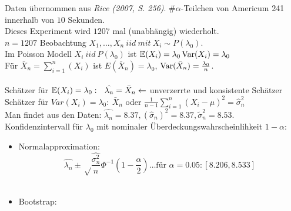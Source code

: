 \documentclass{tstextbook}
\begin{document}
\begin{example} Daten übernommen aus \textit{Rice (2007, S. 256)}.
	$ \# \alpha $-Teilchen von Americum 241 innerhalb von $ 10 $ Sekunden. \\
	Dieses Experiment wird $ 1207 $ mal (unabhängig) wiederholt.\\
	$ n=1207 $ Beobachtung $ X_1,\ldots,X_n \ iid \ mit \ X_i \sim P(\lambda_0). $\\
	Im Poisson Modell $ X_i \ iid \ P(\lambda_0) $ ist $ \mathbb E(X_i)=\lambda_0 \operatorname{Var}(X_i) = \lambda_0 $ \\
	Für $ \bar{X}_n=\sum_{i=1}^{n}(X_i)$ ist $E(\bar{X}_n)=\lambda_0 $, $ \operatorname{Var}(\bar{X}_n) = \frac{\lambda_0}{n} $. \\
	\\
	Schätzer für $ \E(X_i)=\lambda_0: \ \ \hat{\lambda_n} =  \bar{X}_n  \leftarrow $ unverzerrte und konsistente Schätzer \\
	Schätzer für $ Var(X_i)=\lambda_0: \ \bar{X}_n $ oder  $ \frac{1}{n-1} \sum_{i=1}^{n}(X_i - \hat{\mu})^2 = \hat{\sigma}_n^2 $\\

	Man findet aus den Daten: $ \hat{\lambda_n} = 8.37, (\hat{\sigma}_n)^2 = 8.37, \tilde{\sigma}_n^2 = 8.53 $. \\

	Konfidenzintervall für $ \lambda_0 $ mit nominaler Überdeckungswahrscheinlihkeit $1-\alpha $: 
	
	\begin{itemize}
		\item Normalapproximation:
		\[ \hat{\lambda_n} \pm \sqrt\frac{\hat{\sigma_n^2}}{n} \Phi^{-1} \left(1-\frac{\alpha}{2}\right) \ldots \text{für } \alpha = 0.05: [8.206,8.533] \] \\
		\item Bootstrap:
	\end{itemize}


\end{example}
\end{document}
